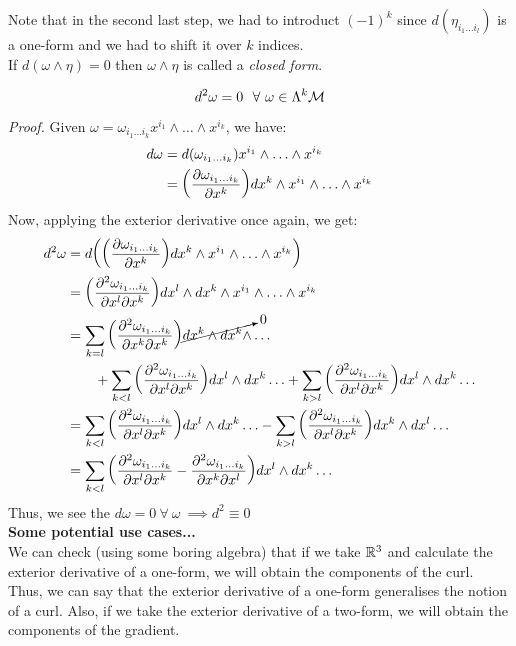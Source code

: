 Note that in the second last step, we had to introduct $(-1)^k$ since $d(\eta_{i_1\ldots i_l})$ is a one-form and we had to shift it over $k$ indices. \\[0.2cm]
If $d(\omega\wedge \eta) =0$ then $\omega\wedge \eta$ is called a \textit{closed form}. 
\begin{lemma}
   $$ d^2\omega = 0 \ \ \forall \ \omega \in \Lambda^k\mathcal M$$
\end{lemma}
\textit{Proof.} Given $\omega =\omega_{i_1\ldots i_k}x^{i_1}\wedge \ldots \wedge x^{i_k}$, we have:
\begin{align*}
    d\omega &= d(\omega_{i_1\ldots i_k}) x^{i_1}\wedge \ldots \wedge x^{i_k}\\
    &=\qty(\pdv{\omega_{i_1\ldots i_k}}{x^k})dx^k\wedge x^{i_1}\wedge \ldots \wedge x^{i_k}
\end{align*}
Now, applying the exterior derivative once again, we get:
\begin{align*}
    d^2\omega &= d\qty(\qty(\pdv{\omega_{i_1\ldots i_k}}{x^k})dx^k\wedge x^{i_1}\wedge \ldots \wedge x^{i_k})\\
    &=\qty(\pdv{\omega_{i_1\ldots i_k}}{x^l}{x^k})dx^l\wedge dx^k\wedge x^{i_1}\wedge \ldots \wedge x^{i_k}\\
    &=\sum\limits_{k=l}\qty(\pdv{\omega_{i_1\ldots i_k}}{x^k}{x^k})\cancelto{0}{dx^k\wedge dx^k\wedge} \ldots \\
    &\qquad +\sum\limits_{k<l} \qty(\pdv{\omega_{i_1\ldots i_k}}{x^l}{x^k})dx^l\wedge dx^k \ldots + \sum\limits_{k>l} \qty(\pdv{\omega_{i_1\ldots i_k}}{x^l}{x^k})dx^l\wedge dx^k\ldots \\
    &=\sum\limits_{k<l} \qty(\pdv{\omega_{i_1\ldots i_k}}{x^l}{x^k})dx^l\wedge dx^k \ldots - \sum\limits_{k>l} \qty(\pdv{\omega_{i_1\ldots i_k}}{x^l}{x^k})dx^k\wedge dx^l\ldots\\
    &=\sum\limits_{k<l} \qty(\pdv{\omega_{i_1\ldots i_k}}{x^l}{x^k} - \pdv{\omega_{i_1\ldots i_k}}{x^k}{x^l})dx^l\wedge dx^k \ldots
\end{align*}
Thus, we see the $d\omega = 0\ \forall \ \omega\  \implies d^2 \equiv 0$\\[0.2cm]
\textbf{Some potential use cases...}\\[0.2cm]
We can check (using some boring algebra) that if we take $\mathbb{R}^3$ and calculate the exterior derivative of a one-form, we will obtain the components of the curl. Thus, we can say that the exterior derivative of a one-form generalises the notion of a curl. Also, if we take the exterior derivative of a two-form, we will obtain the components of the gradient. 